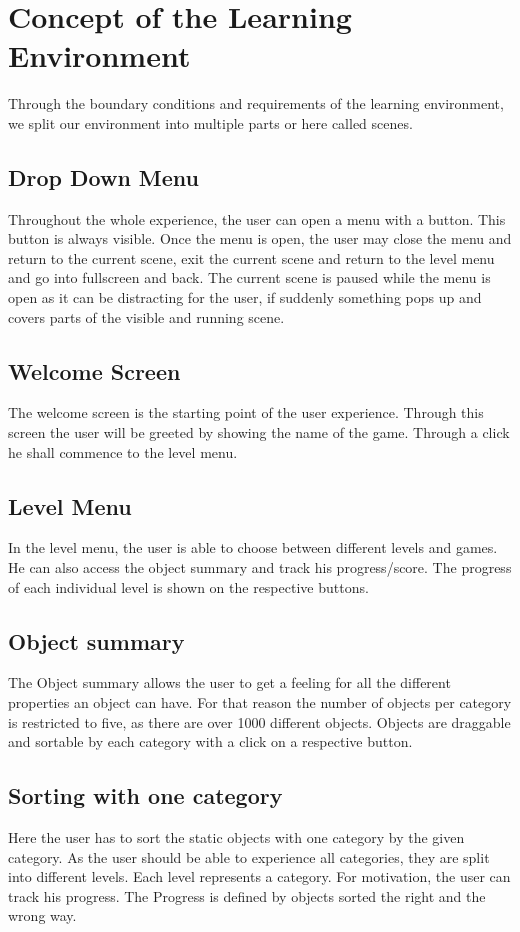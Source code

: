 \section{Concept of the Learning Environment}
Through the boundary conditions and requirements of the learning environment,
we split our environment into multiple parts or here called scenes.

\subsection{Drop Down Menu}
Throughout the whole experience, the user can open a menu with a button.
This button is always visible.
Once the menu is open, the user may close the menu and return to the current scene,
exit the current scene and return to the level menu and go into fullscreen and back.
The current scene is paused while the menu is open as it can be distracting for the user,
if suddenly something pops up and covers parts of the visible and running scene.

\subsection{Welcome Screen}
The welcome screen is the starting point of the user experience.
Through this screen the user will be greeted by showing the name of the game.
Through a click he shall commence to the level menu.

\subsection{Level Menu}
In the level menu, the user is able to choose between different levels and games.
He can also access the object summary and track his progress/score.
The progress of each individual level is shown on the respective buttons.

\subsection{Object summary}
The Object summary allows the user to get a feeling for all the different properties an object can have.
For that reason the number of objects per category is restricted to five, as there are over 1000 different objects.
Objects are draggable and sortable by each category with a click on a respective button.

\subsection{Sorting with one category}
Here the user has to sort the static objects with one category by the given category.
As the user should be able to experience all categories, they are split into different levels.
Each level represents a category.
For motivation, the user can track his progress.
The Progress is defined by objects sorted the right and the wrong way.

